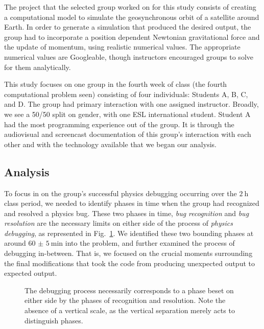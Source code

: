\documentclass{msuphddissertation}
\begin{document}
\begin{doublespace}
The project that the selected group worked on for this study consists of creating a computational model to simulate the geosynchronous orbit of a satellite around Earth.  In order to generate a simulation that produced the desired output, the group had to incorporate a position dependent Newtonian gravitational force and the update of momentum, using realistic numerical values.  The appropriate numerical values are Googleable, though instructors encouraged groups to solve for them analytically.

This study focuses on one group in the fourth week of class (the fourth computational problem seen) consisting of four individuals: Students A, B, C, and D.  The group had primary interaction with one assigned instructor.  Broadly, we see a 50/50 split on gender, with one ESL international student.  Student A had the most programming experience out of the group.  It is through the audiovisual and screencast documentation of this group's interaction with each other and with the technology available that we began our analysis.

\subsection{Analysis}

To focus in on the group's successful physics debugging occurring over the $\SI{2}{\hour}$ class period, we needed to identify phases in time when the group had recognized and resolved a physics bug.  These two phases in time, \emph{bug recognition} and \emph{bug resolution} are the necessary limits on either side of the process of \emph{physics debugging}, as represented in Fig.~\ref{phases}.  We identified these two bounding phases at around $\SI{60(5)}{\minute}$ into the problem, and further examined the process of debugging in-between.  That is, we focused on the crucial moments surrounding the final modifications that took the code from producing unexpected output to expected output.

\begin{figure}
\caption{The debugging process necessarily corresponds to a phase beset on either side by the phases of recognition and resolution.  Note the absence of a vertical scale, as the vertical separation merely acts to distinguish phases.}
\label{phases}
\end{figure}


\end{doublespace}
\end{document}
